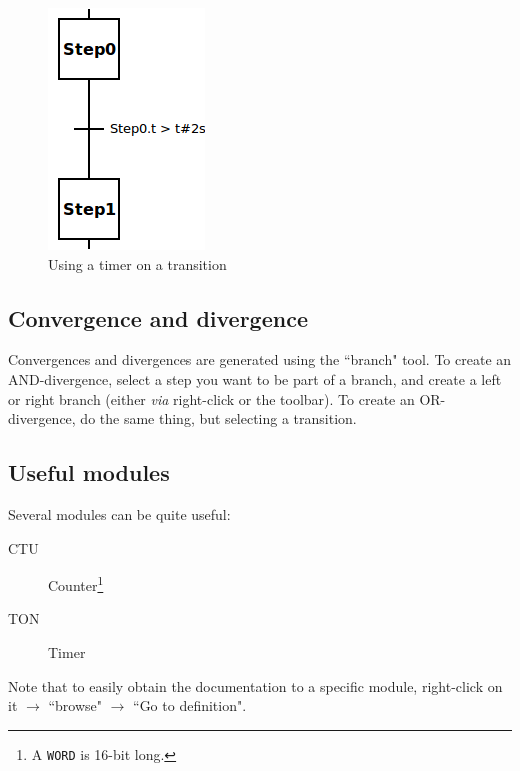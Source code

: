 \documentclass[10pt,a4paper]{article}
\begin{document}
\begin{figure}
  \begin{center}
    \includegraphics{transition-timer.png}
  \end{center}
  \caption{Using a timer on a transition}
  \label{fig:transition-timer}
\end{figure}

\subsection{Convergence and divergence}
Convergences and divergences are generated using the ``branch" tool.
To create an AND-divergence, select a step you want to be part of a branch, and create a left or right branch (either \textit{via} right-click or the toolbar).
To create an OR-divergence, do the same thing, but selecting a transition.

\subsection{Useful modules}
Several modules can be quite useful:
\begin{description}
  \item[CTU] Counter\footnote{A \texttt{WORD} is 16-bit long.}
  \item[TON] Timer
\end{description}

Note that to easily obtain the documentation to a specific module, right-click on it $\rightarrow$ ``browse" $\rightarrow$ ``Go to definition".




\end{document}
